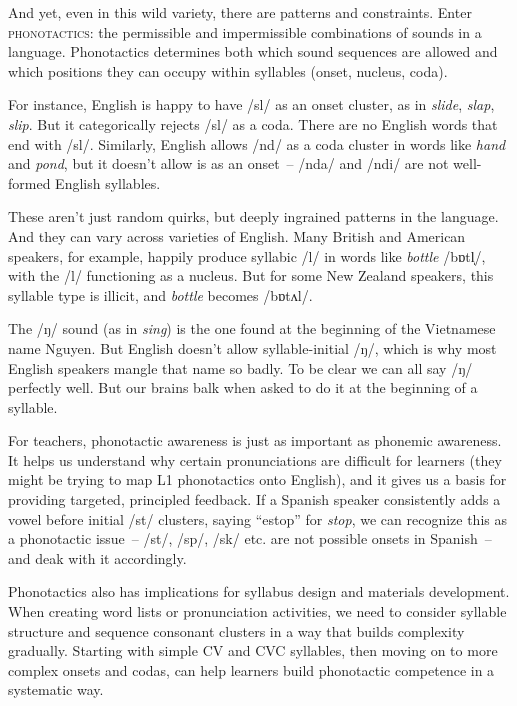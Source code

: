 And yet, even in this wild variety, there are patterns and constraints. Enter \textsc{phonotactics}: the permissible and impermissible combinations of sounds in a language. Phonotactics determines both which sound sequences are allowed and which positions they can occupy within syllables (onset, nucleus, coda).

For instance, English is happy to have /sl/ as an onset cluster, as in \textit{slide}, \textit{slap}, \textit{slip}. But it categorically rejects /sl/ as a coda. There are no English words that end with /sl/. Similarly, English allows /nd/ as a coda cluster in words like \textit{hand} and \textit{pond}, but it doesn't allow is as an onset~-- /nda/ and /ndi/ are not well-formed English syllables.

These aren't just random quirks, but deeply ingrained patterns in the language. And they can vary across varieties of English. Many British and American speakers, for example, happily produce syllabic /l/ in words like \textit{bottle} /bɒtl̩/, with the /l/ functioning as a nucleus. But for some New Zealand speakers, this syllable type is illicit, and \textit{bottle} becomes /bɒtʌl/.

The /ŋ/ sound (as in \textit{sing}) is the one found at the beginning of the Vietnamese name Nguyen. But English doesn't allow syllable-initial /ŋ/, which is why most English speakers mangle that name so badly. To be clear we can all say /ŋ/ perfectly well. But our brains balk when asked to do it at the beginning of a syllable.

For teachers, phonotactic awareness is just as important as phonemic awareness. It helps us understand why certain pronunciations are difficult for learners (they might be trying to map L1 phonotactics onto English), and it gives us a basis for providing targeted, principled feedback. If a Spanish speaker consistently adds a vowel before initial /st/ clusters, saying ``estop'' for \textit{stop}, we can recognize this as a phonotactic issue~-- /st/, /sp/, /sk/ etc. are not possible onsets in Spanish~-- and deak with it accordingly.

Phonotactics also has implications for syllabus design and materials development. When creating word lists or pronunciation activities, we need to consider syllable structure and sequence consonant clusters in a way that builds complexity gradually. Starting with simple CV and CVC syllables, then moving on to more complex onsets and codas, can help learners build phonotactic competence in a systematic way.

